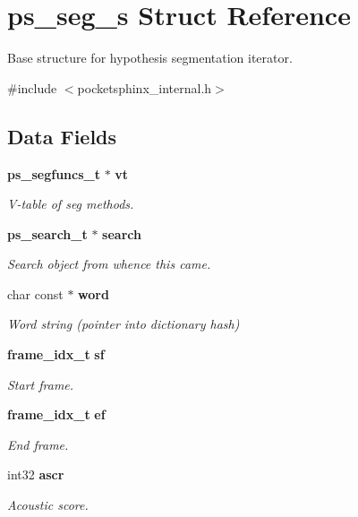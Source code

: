 \section{ps\+\_\+seg\+\_\+s Struct Reference}
\label{structps__seg__s}


Base structure for hypothesis segmentation iterator.  




{\ttfamily \#include $<$pocketsphinx\+\_\+internal.\+h$>$}

\subsection*{Data Fields}
\begin{DoxyCompactItemize}
\item 
\mbox{\label{structps__seg__s_a510362a2281e374c839397c3e5488515}} 
\textbf{ ps\+\_\+segfuncs\+\_\+t} $\ast$ \textbf{ vt}
\begin{DoxyCompactList}\small\item\em V-\/table of seg methods. \end{DoxyCompactList}\item 
\mbox{\label{structps__seg__s_a14168ddcb60e094dad36c7c920a79bb3}} 
\textbf{ ps\+\_\+search\+\_\+t} $\ast$ \textbf{ search}
\begin{DoxyCompactList}\small\item\em Search object from whence this came. \end{DoxyCompactList}\item 
\mbox{\label{structps__seg__s_a97a0dc7db931c7e3f98d23d21ce27f04}} 
char const  $\ast$ \textbf{ word}
\begin{DoxyCompactList}\small\item\em Word string (pointer into dictionary hash) \end{DoxyCompactList}\item 
\textbf{ frame\+\_\+idx\+\_\+t} \textbf{ sf}
\begin{DoxyCompactList}\small\item\em Start frame. \end{DoxyCompactList}\item 
\textbf{ frame\+\_\+idx\+\_\+t} \textbf{ ef}
\begin{DoxyCompactList}\small\item\em End frame. \end{DoxyCompactList}\item 
int32 \textbf{ ascr}
\begin{DoxyCompactList}\small\item\em Acoustic score. \end{DoxyCompactList}\item 

\end{DoxyCompactItemize}
